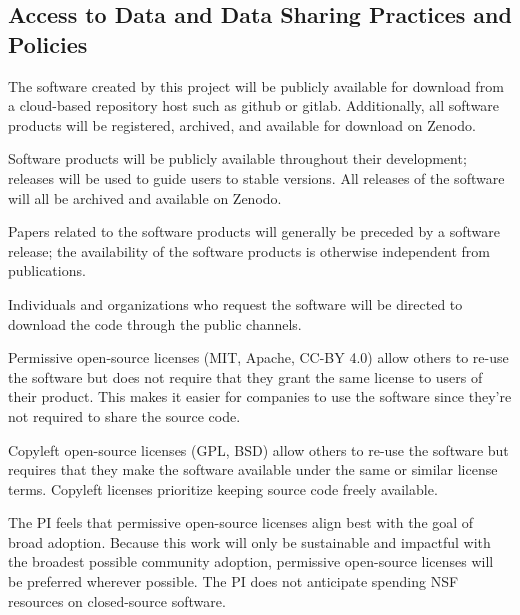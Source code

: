 \documentclass[11pt,oneside]{memoir}
\begin{document}
\subsection{Access to Data and Data Sharing Practices and Policies}
The software created by this project will be publicly available for download from a cloud-based repository host such as github or gitlab.  Additionally, all software products will be registered, archived, and available for download on Zenodo.

Software products will be publicly available throughout their development; releases will be used to guide users to stable versions.  All releases of the software will all be archived and available on Zenodo.

Papers related to the software products will generally be preceded by a software release; the availability of the software products is otherwise independent from publications.

Individuals and organizations who request the software will be directed to download the code through the public channels.


Permissive open-source licenses (MIT, Apache, CC-BY 4.0) allow others to re-use the software but does not require that they grant the same license to users of their product.  This makes it easier for companies to use the software since they're not required to share the source code.

Copyleft open-source licenses (GPL, BSD) allow others to re-use the software but requires that they make the software available under the same or similar license terms.  Copyleft licenses prioritize keeping source code freely available.

The PI feels that permissive open-source licenses align best with the goal of broad adoption.  Because this work will only be sustainable and impactful with the broadest possible community adoption, permissive open-source licenses will be preferred wherever possible.  The PI does not anticipate spending NSF resources on closed-source software.

\end{document}
